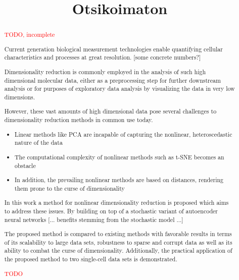\begin{abstract}

\textcolor{red}{TODO, incomplete}

Current generation biological measurement technologies enable quantifying cellular characteristics and processes at great resolution. [some concrete numbers?]

Dimensionality reduction is commonly employed in the analysis of such high dimensional molecular data, either as a preprocessing step for further downstream analysis or for purposes of exploratory data analysis by visualizing the data in very low dimensions.

However, these vast amounts of high dimensional data pose several challenges to dimensionality reduction methods in common use today.
\begin{itemize}
\item Linear methods like PCA are incapable of capturing the nonlinear, heteroscedastic nature of the data
\item The computational complexity of nonlinear methods such as t-SNE becomes an obstacle
\item In addition, the prevailing nonlinear methods are based on distances, rendering them prone to the curse of dimensionality
\end{itemize}

In this work a method for nonlinear dimensionality reduction is proposed which aims to address these issues. By building on top of a stochastic variant of autoencoder neural networks [... benefits stemming from the stochastic model ...]

The proposed method is compared to existing methods with favorable results in terms of its scalability to large data sets, robustness to sparse and corrupt data as well as its ability to combat the curse of dimensionality. Additionally, the practical application of the proposed method to two single-cell data sets is demonstrated.

\end{abstract}

\begin{otherlanguage}{finnish}

\title{Otsikoimaton}
\examiner{}
\keywords{}

\begin{abstract}

\textcolor{red}{TODO}

\end{abstract}
\end{otherlanguage}

